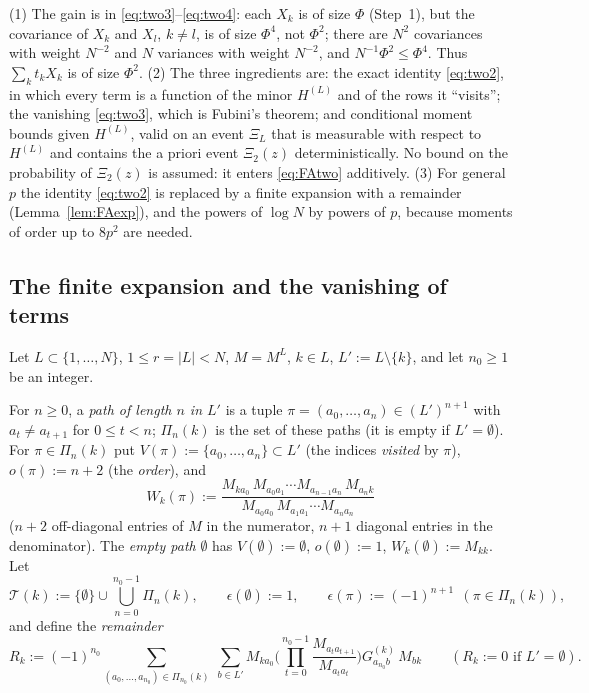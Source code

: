 \begin{remark}[Reading of the case $p=2$]\label{rem:FAtwo}
(1) The gain is in \eqref{eq:two3}--\eqref{eq:two4}: each $X_k$ is of size $\Phi$ (Step~1), but the covariance of $X_k$ and $X_l$, $k\ne l$, is of size $\Phi^4$, not $\Phi^2$; there are $N^2$ covariances with weight $N^{-2}$ and $N$ variances with weight $N^{-2}$, and $N^{-1}\Phi^2\le\Phi^4$. Thus $\sum_kt_kX_k$ is of size $\Phi^2$.
(2) The three ingredients are: the exact identity \eqref{eq:two2}, in which every term is a function of the minor $H^{(L)}$ and of the rows it ``visits''; the vanishing \eqref{eq:two3}, which is Fubini's theorem; and conditional moment bounds given $H^{(L)}$, valid on an event $\Xi_L$ that is measurable with respect to $H^{(L)}$ and contains the a priori event $\Xi_2(z)$ deterministically.
No bound on the probability of $\Xi_2(z)$ is assumed: it enters \eqref{eq:FAtwo} additively.
(3) For general $p$ the identity \eqref{eq:two2} is replaced by a finite expansion with a remainder (Lemma~\ref{lem:FAexp}), and the powers of $\log N$ by powers of $p$, because moments of order up to $8p^2$ are needed.
\end{remark}

\subsection{The finite expansion and the vanishing of terms}\label{sec:FAexp}
Let $L\subset\{1,\dots,N\}$, $1\le r=|L|<N$, $M=M^L$, $k\in L$, $L':=L\setminus\{k\}$, and let $n_0\ge1$ be an integer.
\begin{definition}[Paths]\label{def:FApaths}
For $n\ge0$, a \emph{path of length $n$ in $L'$} is a tuple $\pi=(a_0,\dots,a_n)\in(L')^{n+1}$ with $a_t\ne a_{t+1}$ for $0\le t<n$; $\Pi_n(k)$ is the set of these paths (it is empty if $L'=\emptyset$).
For $\pi\in\Pi_n(k)$ put $V(\pi):=\{a_0,\dots,a_n\}\subset L'$ (the indices \emph{visited} by $\pi$), $o(\pi):=n+2$ (the \emph{order}), and
\begin{equation}\label{eq:Wk}
 W_k(\pi):=\frac{M_{ka_0}\,M_{a_0a_1}\cdots M_{a_{n-1}a_n}\,M_{a_nk}}{M_{a_0a_0}\,M_{a_1a_1}\cdots M_{a_na_n}}
\end{equation}
($n+2$ off-diagonal entries of $M$ in the numerator, $n+1$ diagonal entries in the denominator). The \emph{empty path} $\emptyset$ has $V(\emptyset):=\emptyset$, $o(\emptyset):=1$, $W_k(\emptyset):=M_{kk}$. Let
\[
 \mathcal T(k):=\{\emptyset\}\cup\bigcup_{n=0}^{n_0-1}\Pi_n(k),\qquad\epsilon(\emptyset):=1,\qquad\epsilon(\pi):=(-1)^{n+1}\ \ (\pi\in\Pi_n(k)),
\]
and define the \emph{remainder}
\begin{equation}\label{eq:Rk}
 R_k:=(-1)^{n_0}\sum_{(a_0,\dots,a_{n_0})\in\Pi_{n_0}(k)}\ \sum_{b\in L'}M_{ka_0}\Big(\prod_{t=0}^{n_0-1}\frac{M_{a_ta_{t+1}}}{M_{a_ta_t}}\Big)G^{(k)}_{a_{n_0}b}\,M_{bk}\qquad(R_k:=0\text{ if }L'=\emptyset).
\end{equation}
\end{definition}


